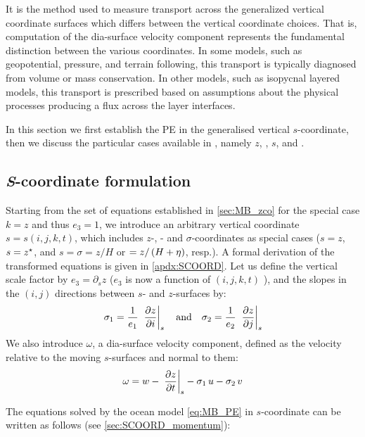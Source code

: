 \documentclass[../main/NEMO_manual]{subfiles}
\begin{document}
It is the method used to measure transport across the generalized vertical coordinate surfaces which
differs between the vertical coordinate choices.
That is,
computation of the dia-surface velocity component represents the fundamental distinction between
the various coordinates.
In some models, such as geopotential, pressure, and terrain following,
this transport is typically diagnosed from volume or mass conservation.
In other models, such as isopycnal layered models,
this transport is prescribed based on assumptions about the physical processes producing
a flux across the layer interfaces.

In this section we first establish the PE in the generalised vertical $s$-coordinate,
then we discuss the particular cases available in \NEMO, namely $z$, \zstar, $s$, and \ztilde.

\subsection{\textit{S}-coordinate formulation}

Starting from the set of equations established in \autoref{sec:MB_zco} for
the special case $k = z$ and thus $e_3 = 1$,
we introduce an arbitrary vertical coordinate $s = s(i,j,k,t)$,
which includes $z$-, \zstar- and $\sigma$-coordinates as special cases
($s = z$, $s = \zstar$, and $s = \sigma = z / H$ or $ = z / \lt( H + \eta \rt)$, resp.).
A formal derivation of the transformed equations is given in \autoref{apdx:SCOORD}.
Let us define the vertical scale factor by $e_3 = \partial_s z$
($e_3$ is now a function of $(i,j,k,t)$ ),
and the slopes in the $(i,j)$ directions between $s$- and $z$-surfaces by:
\begin{equation}
  \label{eq:MB_sco_slope}
  \sigma_1 = \frac{1}{e_1} \; \lt. \pd[z]{i} \rt|_s \quad \text{and} \quad
  \sigma_2 = \frac{1}{e_2} \; \lt. \pd[z]{j} \rt|_s
\end{equation}
We also introduce $\omega$, a dia-surface velocity component,
defined as the velocity relative to the moving $s$-surfaces and normal to them:
\[
  \omega = w -  \, \lt. \pd[z]{t} \rt|_s - \sigma_1 \, u - \sigma_2 \, v
\]

The equations solved by the ocean model \autoref{eq:MB_PE} in $s$-coordinate can be written as follows
(see \autoref{sec:SCOORD_momentum}):
\end{document}
